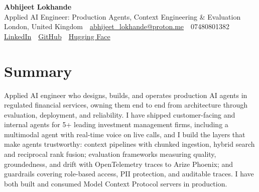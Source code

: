 \documentclass[10pt,a4paper]{article}
\newcommand{\sep}{\,\textcolor{accent!60}{\textbar}\,}
\begin{document}
\begin{center}
  {\fontsize{24}{26}\selectfont\bfseries Abhijeet Lokhande}\\[3pt]
  {\color{accent}\large Applied AI Engineer: Production Agents, Context Engineering \& Evaluation}\\[5pt]
  {\small
    London, United Kingdom \sep
    \href{mailto:abhijeet_lokhande@proton.me}{abhijeet\_lokhande@proton.me} \sep
    07480801382 \\[2pt]
    \href{https://www.linkedin.com/in/ablds/}{LinkedIn} \sep
    \href{https://github.com/abhijeetscode}{GitHub} \sep
    \href{https://huggingface.co/ab-ai}{Hugging Face}
  }
\end{center}
\vspace{2pt}

\section{Summary}
Applied AI engineer who designs, builds, and operates production AI agents in regulated financial services, owning them end to end from architecture through evaluation, deployment, and reliability. I have shipped customer-facing and internal agents for 5+ leading investment management firms, including a multimodal agent with real-time voice on live calls, and I build the layers that make agents trustworthy: context pipelines with chunked ingestion, hybrid search and reciprocal rank fusion; evaluation frameworks measuring quality, groundedness, and drift with OpenTelemetry traces to Arize Phoenix; and guardrails covering role-based access, PII protection, and auditable traces. I have both built and consumed Model Context Protocol servers in production.

\end{document}
